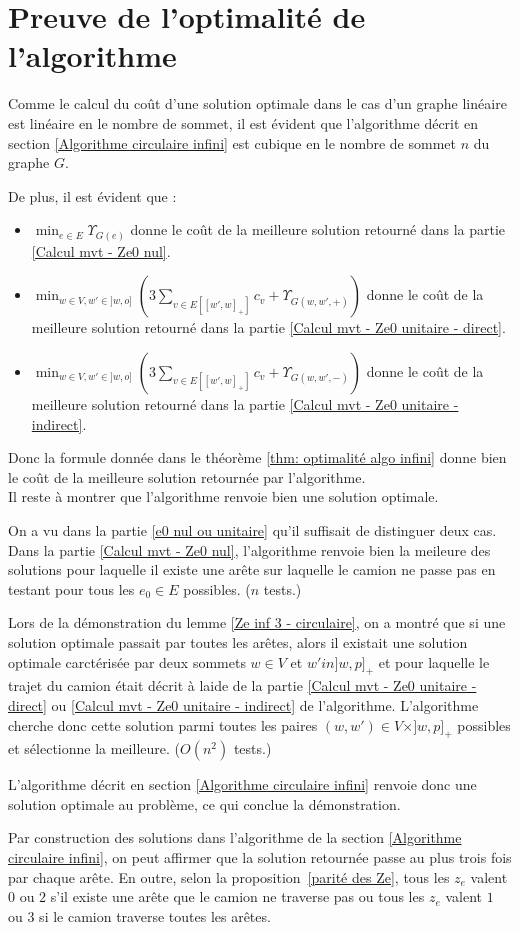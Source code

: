 \section{Preuve de l'optimalité de l'algorithme}

Comme le calcul du coût d'une solution optimale dans le cas d'un graphe linéaire est linéaire en le nombre de sommet, il est évident que l'algorithme décrit en section \ref{Algorithme circulaire infini} est cubique en le nombre de sommet $n$ du graphe $G$.

De plus, il est évident que :
\begin{itemize}
\item $\min_{e \in E} \Upsilon_{G(e)}$ donne le coût de la meilleure solution retourné dans la partie \ref{Calcul mvt - Ze0 nul}.
\item $\min_{w \in V, w' \in ]w,o]} \left(3 \sum_{ v \in E\left[ \left[w',w\right]_+ \right] }c_v + \Upsilon_{G(w,w',+)}\right)$ donne le coût de la meilleure solution retourné dans la partie \ref{Calcul mvt - Ze0 unitaire - direct}.
\item $\min_{w \in V, w' \in ]w,o]} \left(3 \sum_{ v \in E\left[ \left[w',w\right]_+ \right] }c_v + \Upsilon_{G(w,w',-)}\right)$ donne le coût de la meilleure solution retourné dans la partie \ref{Calcul mvt - Ze0 unitaire - indirect}.
\end{itemize}
Donc la formule donnée dans le théorème \ref{thm: optimalité algo infini} donne bien le coût de la meilleure solution retournée par l'algorithme.
\\

Il reste à montrer que l'algorithme renvoie bien une solution optimale.

On a vu dans la partie \ref{e0 nul ou unitaire} qu'il suffisait de distinguer deux cas. Dans la partie \ref{Calcul mvt - Ze0 nul}, l'algorithme renvoie bien la meileure des solutions pour laquelle il existe une arête sur laquelle le camion ne passe pas en testant pour tous les $e_0 \in E$ possibles. ($n$ tests.)

Lors de la démonstration du lemme \ref{Ze inf 3 - circulaire}, on a montré que si une solution optimale passait par toutes les arêtes, alors il existait une solution optimale carctérisée par deux sommets $w \in V$ et $w' in ]w,p]_+$ et pour laquelle le trajet du camion était décrit à laide de la partie \ref{Calcul mvt - Ze0 unitaire - direct} ou \ref{Calcul mvt - Ze0 unitaire - indirect} de l'algorithme. L'algorithme cherche donc cette solution parmi toutes les paires $(w,w') \in V\times ]w,p]_+$ possibles et sélectionne la meilleure. ($O(n^2)$ tests.)

L'algorithme décrit en section \ref{Algorithme circulaire infini} renvoie donc une solution optimale au problème, ce qui conclue la démonstration.

\begin{rmq}
Par construction des solutions dans l'algorithme de la section \ref{Algorithme circulaire infini}, on peut affirmer que la solution retournée passe au plus trois fois par chaque arête. En outre, selon la proposition~\ref{parité des Ze}, tous les $z_e$ valent $0$ ou $2$ s'il existe une arête que le camion ne traverse pas ou tous les $z_e$ valent $1$ ou $3$ si le camion traverse toutes les arêtes.
\end{rmq}